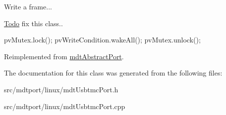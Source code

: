 Write a frame... 

\begin{Desc}
\item[\hyperlink{todo__todo000002}{Todo}]fix this class.. \end{Desc}


pvMutex.lock(); pvWriteCondition.wakeAll(); pvMutex.unlock();



Reimplemented from \hyperlink{classmdt_abstract_port_a2235d62d9a9e4555d41773c41cc3bc70}{mdtAbstractPort}.



The documentation for this class was generated from the following files:\begin{DoxyCompactItemize}
\item 
src/mdtport/linux/mdtUsbtmcPort.h\item 
src/mdtport/linux/mdtUsbtmcPort.cpp\end{DoxyCompactItemize}
